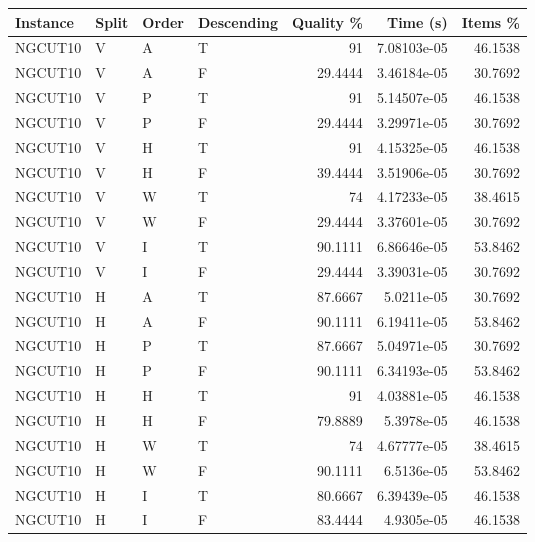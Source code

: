 \begin{tabular}{llllrrr}
    \hline
    Instance & Split & Order & Descending & Quality \% & Time (s)    & Items \% \\
    \hline
    NGCUT10  & V     & A     & T          & 91         & 7.08103e-05 & 46.1538  \\
    NGCUT10  & V     & A     & F          & 29.4444    & 3.46184e-05 & 30.7692  \\
    NGCUT10  & V     & P     & T          & 91         & 5.14507e-05 & 46.1538  \\
    NGCUT10  & V     & P     & F          & 29.4444    & 3.29971e-05 & 30.7692  \\
    NGCUT10  & V     & H     & T          & 91         & 4.15325e-05 & 46.1538  \\
    NGCUT10  & V     & H     & F          & 39.4444    & 3.51906e-05 & 30.7692  \\
    NGCUT10  & V     & W     & T          & 74         & 4.17233e-05 & 38.4615  \\
    NGCUT10  & V     & W     & F          & 29.4444    & 3.37601e-05 & 30.7692  \\
    NGCUT10  & V     & I     & T          & 90.1111    & 6.86646e-05 & 53.8462  \\
    NGCUT10  & V     & I     & F          & 29.4444    & 3.39031e-05 & 30.7692  \\
    NGCUT10  & H     & A     & T          & 87.6667    & 5.0211e-05  & 30.7692  \\
    NGCUT10  & H     & A     & F          & 90.1111    & 6.19411e-05 & 53.8462  \\
    NGCUT10  & H     & P     & T          & 87.6667    & 5.04971e-05 & 30.7692  \\
    NGCUT10  & H     & P     & F          & 90.1111    & 6.34193e-05 & 53.8462  \\
    NGCUT10  & H     & H     & T          & 91         & 4.03881e-05 & 46.1538  \\
    NGCUT10  & H     & H     & F          & 79.8889    & 5.3978e-05  & 46.1538  \\
    NGCUT10  & H     & W     & T          & 74         & 4.67777e-05 & 38.4615  \\
    NGCUT10  & H     & W     & F          & 90.1111    & 6.5136e-05  & 53.8462  \\
    NGCUT10  & H     & I     & T          & 80.6667    & 6.39439e-05 & 46.1538  \\
    NGCUT10  & H     & I     & F          & 83.4444    & 4.9305e-05  & 46.1538  \\

\end{tabular}
